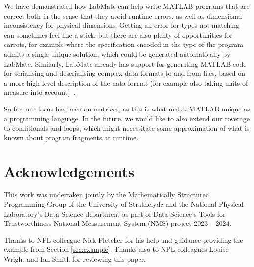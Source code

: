 \documentclass{IMEKO2024}
\begin{document}
We have demonstrated how LabMate can help write MATLAB programs that are correct both in the sense that they avoid runtime errors, as well as dimensional inconsistency for physical dimensions.
%
Getting an error for types not matching can sometimes feel like a stick, but there are also plenty of opportunities for carrots, for example where the specification encoded in the type of the program admits a single unique solution, which could be generated automatically by LabMate.
%
Similarly, LabMate already has support for generating MATLAB code for serialising and deserialising complex data formats to and from files, based on a more high-level description of the data format (for example also taking units of measure into account)~\cite{mgen}.

So far, our focus has been on matrices, as this is what makes MATLAB
unique as a programming language.
%
In the future, we would like to also extend our coverage to
conditionals and loops, which might necessitate some approximation of
what is known about program fragments at runtime.

\section{Acknowledgements}

This work was undertaken jointly by the Mathematically Structured Programming Group of the University of Strathclyde and the National Physical Laboratory’s Data Science department as part of Data Science’s Tools for Trustworthiness National Measurement System (NMS) project 2023 – 2024.

Thanks to NPL colleague Nick Fletcher for his help and guidance providing the example from Section \ref{sec:example}. Thanks also to NPL colleagues Louise Wright and Ian Smith for reviewing this paper.



\end{document}
